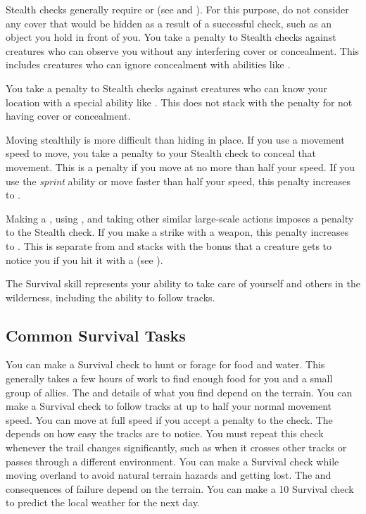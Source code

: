         Stealth checks generally require  or  (see  and ).
        For this purpose, do not consider any cover that would be hidden as a result of a successful check, such as an object you hold in front of you.
        You take a  penalty to Stealth checks against creatures who can observe you without any interfering cover or concealment.
        This includes creatures who can ignore concealment with abilities like .

        You take a  penalty to Stealth checks against creatures who can know your location with a special ability like .
        This does not stack with the penalty for not having cover or concealment.

        Moving stealthily is more difficult than hiding in place.
        If you use a movement speed to move, you take a penalty to your Stealth check to conceal that movement.
        This is a  penalty if you move at no more than half your speed.
        If you use the \textit{sprint} ability or move faster than half your speed, this penalty increases to .

        Making a , using , and taking other similar large-scale actions imposes a  penalty to the Stealth check.
        If you make a strike with a  weapon, this penalty increases to .
        This is separate from and stacks with the  bonus that a creature gets to notice you if you hit it with a  (see ).

\newpage
{}
        The Survival skill represents your ability to take care of yourself and others in the wilderness, including the ability to follow tracks.

    \subsection{Common Survival Tasks}
         You can make a Survival check to hunt or forage for food and water.
        This generally takes a few hours of work to find enough food for you and a small group of allies.
        The  and details of what you find depend on the terrain.
         You can make a Survival check to follow tracks at up to half your normal movement speed.
        You can move at full speed if you accept a  penalty to the check.
        The  depends on how easy the tracks are to notice.
        You must repeat this check whenever the trail changes significantly, such as when it crosses other tracks or passes through a different environment.
         You can make a Survival check while moving overland to avoid natural terrain hazards and getting lost.
        The  and consequences of failure depend on the terrain.
         You can make a  10 Survival check to predict the local weather for the next day.

